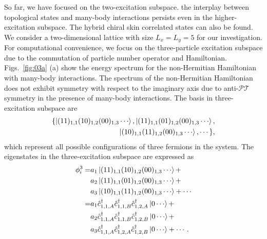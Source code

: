 \documentclass[longbibliography, aps, prx, amsmath, amssymb, amsfonts, twocolumn,superscriptaddress, footinbib]{revtex4-1}
\begin{document}
	So far, we have focused on the two-excitation subspace. {\color{blue}{In fact,}} the interplay between topological states and many-body interactions persists even in the higher-excitation subspace. The hybrid chiral skin correlated states can also be found. 
	We consider a two-dimensional lattice with size $L_x = L_y = 5$ for our investigation. For computational convenience, we focus on the three-particle excitation subspace due to the commutation of particle number operator and Hamiltonian. 
	Figs.~\ref{fig:03a} (a) show the energy spectrum
	for the non-Hermitian Hamiltonian with many-body interactions. 
	The spectrum of the non-Hermitian Hamiltonian does not exhibit symmetry with respect to the imaginary axis due to anti-$\mathcal{PT}$ symmetry in the presence of many-body interactions. 
	The basis in three-excitation subspace are
	\begin{equation}
		\begin{split}
		\{\ket{(11)_{1,1}(10)_{1,2}(00)_{1,3}\cdots}, \ket{(11)_{1,1}(01)_{1,2}(00)_{1,3}\cdots}, \\
		\ket{(10)_{1,1}(11)_{1,2}(00)_{1,3}\cdots},\cdots\}, 
		\end{split}
	\end{equation}
	which represent all possible configurations of three fermions in the system. 
	The eigenstates in the three-excitation subspace are expressed as 
	\begin{equation}
		\begin{split}
			\phi_i^3 =& a_1 \ket{(11)_{1,1}(10)_{1,2}(00)_{1,3}\cdots} +\\
			&a_2 \ket{(11)_{1,1}(01)_{1,2}(00)_{1,3}\cdots} +\\
			&a_3 \ket{(10)_{1,1}(11)_{1,2}(00)_{1,3}\cdots} + \cdots\\
			=& a_1 \hat{c}_{1,1,A}^{\dagger}\hat{c}_{1,1,B}^{\dagger}\hat{c}_{1,2,A}^{\dagger} \ket{0\cdots} +\\
			&a_2 \hat{c}_{1,1,A}^{\dagger}\hat{c}_{1,1,B}^{\dagger}\hat{c}_{1,2,B}^{\dagger} \ket{0\cdots} + \\
			&a_3 \hat{c}_{1,1,A}^{\dagger}\hat{c}_{1,2,A}^{\dagger}\hat{c}_{1,2,B}^{\dagger} \ket{0\cdots} + \cdots.
		\end{split}
	\end{equation}
\end{document}
